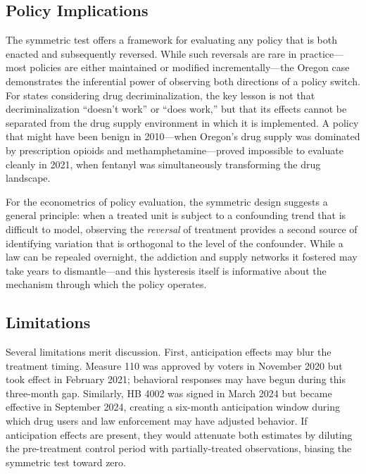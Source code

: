 \documentclass[12pt]{article}
\begin{document}
\subsection{Policy Implications}

The symmetric test offers a framework for evaluating any policy that is both enacted and subsequently reversed. While such reversals are rare in practice---most policies are either maintained or modified incrementally---the Oregon case demonstrates the inferential power of observing both directions of a policy switch. For states considering drug decriminalization, the key lesson is not that decriminalization ``doesn't work'' or ``does work,'' but that its effects cannot be separated from the drug supply environment in which it is implemented. A policy that might have been benign in 2010---when Oregon's drug supply was dominated by prescription opioids and methamphetamine---proved impossible to evaluate cleanly in 2021, when fentanyl was simultaneously transforming the drug landscape.

For the econometrics of policy evaluation, the symmetric design suggests a general principle: when a treated unit is subject to a confounding trend that is difficult to model, observing the \textit{reversal} of treatment provides a second source of identifying variation that is orthogonal to the level of the confounder. While a law can be repealed overnight, the addiction and supply networks it fostered may take years to dismantle---and this hysteresis itself is informative about the mechanism through which the policy operates.

\subsection{Limitations}

Several limitations merit discussion. First, anticipation effects may blur the treatment timing. Measure 110 was approved by voters in November 2020 but took effect in February 2021; behavioral responses may have begun during this three-month gap. Similarly, HB 4002 was signed in March 2024 but became effective in September 2024, creating a six-month anticipation window during which drug users and law enforcement may have adjusted behavior. If anticipation effects are present, they would attenuate both estimates by diluting the pre-treatment control period with partially-treated observations, biasing the symmetric test toward zero.
\end{document}
